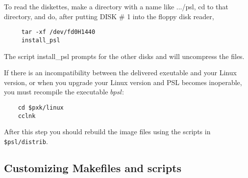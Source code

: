 To read the diskettes, make a directory with a name like .../psl, cd to that
directory, and do, after putting DISK \# 1 into the floppy disk reader,

\begin{verbatim}
     tar -xf /dev/fd0H1440
     install_psl
\end{verbatim}

The script install\_psl prompts for the other disks and will uncompress the
files.

If there is an incompatibility between the delivered exeutable and
your Linux version, or when you upgrade your Linux version
and {\small PSL} becomes inoperable, you must recompile the
executable $bpsl$:
\begin{verbatim}
    cd $pxk/linux
    cclnk
\end{verbatim}
After this step you should rebuild the image files using the
scripts in \verb+$psl/distrib+.

\subsection{Customizing Makefiles and scripts}

